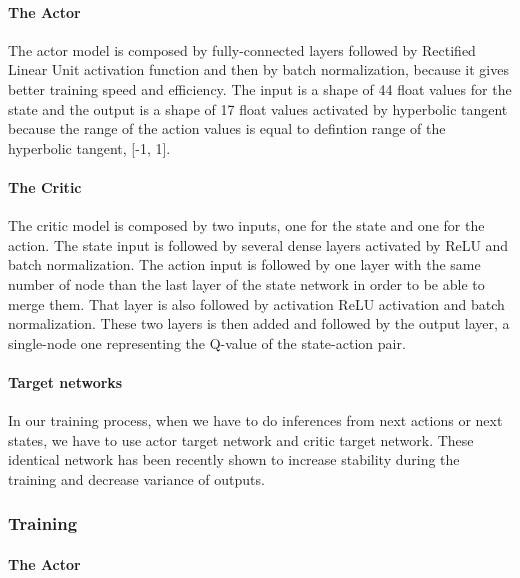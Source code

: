 \documentclass{article}
\begin{document}
\paragraph{The Actor}

The actor model is composed by fully-connected layers followed by Rectified
Linear Unit activation function and then by batch normalization, because it
gives better training speed and efficiency. The input is a shape of 44 float
values for the state and the output is a shape of 17 float values activated by
hyperbolic tangent because the range of the action values is equal to defintion
range of the hyperbolic tangent, [-1, 1].

\paragraph{The Critic}

The critic model is composed by two inputs, one for the state and one for the
action. The state input is followed by several dense layers activated by ReLU
and batch normalization. The action input is followed by one layer with the same
number of node than the last layer of the state network in order to be able to
merge them. That layer is also followed by activation ReLU activation and
batch normalization. These two layers is then added and followed by the output
layer, a single-node one representing the Q-value of the state-action pair.

\paragraph{Target networks}

In our training process, when we have to do inferences from next actions or next
states, we have to use actor target network and critic target network. These
identical network has been recently shown to increase stability during the
training and decrease variance of outputs.

\subsubsection{Training}

\paragraph{The Actor}
\end{document}
